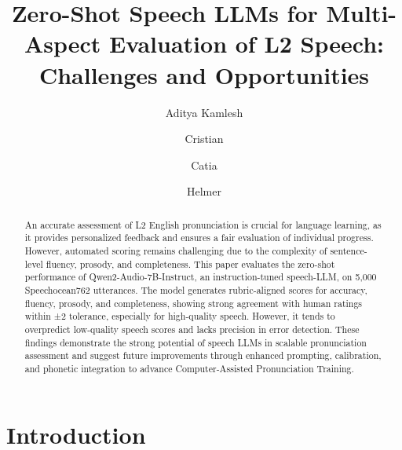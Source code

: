 \documentclass{Interspeech}
\title{Zero-Shot Speech LLMs for Multi-Aspect Evaluation of L2 Speech: Challenges and Opportunities}
\author{Aditya Kamlesh}{Parikh}
\author{Cristian}{Tejedor-Garcia}
\author{Catia}{Cucchiarini}
\author{Helmer}{Strik}
\affiliation{Centre for Language Studies}{Radboud University}{the Netherlands}
\begin{document}
\maketitle

\begin{abstract}
An accurate assessment of L2 English pronunciation is crucial for language learning, as it provides personalized feedback and ensures a fair evaluation of individual progress. However, automated scoring remains challenging due to the complexity of sentence-level fluency, prosody, and completeness. This paper evaluates the zero-shot performance of Qwen2-Audio-7B-Instruct, an instruction-tuned speech-LLM, on 5,000 Speechocean762 utterances. The model generates rubric-aligned scores for accuracy, fluency, prosody, and completeness, showing strong agreement with human ratings within ±2 tolerance, especially for high-quality speech. However, it tends to overpredict low-quality speech scores and lacks precision in error detection. These findings demonstrate the strong potential of speech LLMs in scalable pronunciation assessment and suggest future improvements through enhanced prompting, calibration, and phonetic integration to advance Computer-Assisted Pronunciation Training.

    
\end{abstract}




\section{Introduction}
\end{document}
